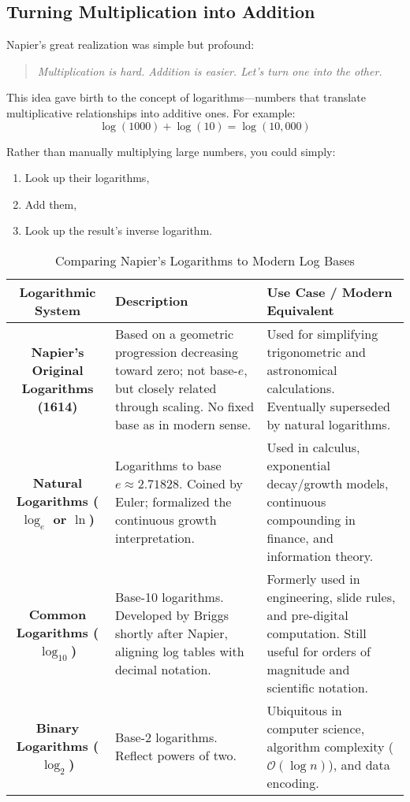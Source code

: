 \subsection{Turning Multiplication into Addition}

Napier’s great realization was simple but profound: 
\begin{quote}
\textit{Multiplication is hard. Addition is easier. Let’s turn one into the other.}
\end{quote}

This idea gave birth to the concept of logarithms—numbers that translate multiplicative relationships into additive ones. For example:
\[
\log(1000) + \log(10) = \log(10{,}000)
\]

Rather than manually multiplying large numbers, you could simply:
\begin{enumerate}
  \item Look up their logarithms,
  \item Add them,
  \item Look up the result’s inverse logarithm.
\end{enumerate}


\begin{table}[H]
    \centering
    \caption{Comparing Napier’s Logarithms to Modern Log Bases}
    \renewcommand{\arraystretch}{1.3}
    \begin{tabular}{|c|p{4.5cm}|p{6.5cm}|}
    \hline
    \textbf{Logarithmic System} & \textbf{Description} & \textbf{Use Case / Modern Equivalent} \\
    \hline
    \textbf{Napier’s Original Logarithms (1614)} & Based on a geometric progression decreasing toward zero; not base-\( e \), but closely related through scaling. No fixed base as in modern sense. & Used for simplifying trigonometric and astronomical calculations. Eventually superseded by natural logarithms. \\
    \hline
    \textbf{Natural Logarithms (\( \log_e \) or \( \ln \))} & Logarithms to base \( e \approx 2.71828 \). Coined by Euler; formalized the continuous growth interpretation. & Used in calculus, exponential decay/growth models, continuous compounding in finance, and information theory. \\
    \hline
    \textbf{Common Logarithms (\( \log_{10} \))} & Base-10 logarithms. Developed by Briggs shortly after Napier, aligning log tables with decimal notation. & Formerly used in engineering, slide rules, and pre-digital computation. Still useful for orders of magnitude and scientific notation. \\
    \hline
    \textbf{Binary Logarithms (\( \log_2 \))} & Base-2 logarithms. Reflect powers of two. & Ubiquitous in computer science, algorithm complexity (\( \mathcal{O}(\log n) \)), and data encoding. \\
    \hline
    \end{tabular}
\end{table}


